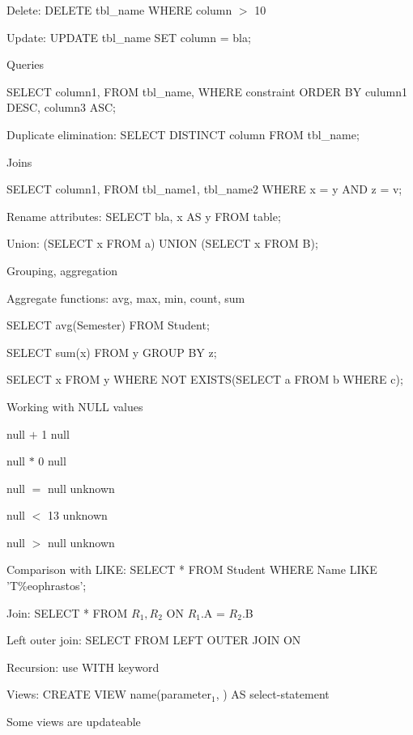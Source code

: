 		\item Delete: DELETE tbl\_name WHERE column $>$ 10
		\item Update: UPDATE tbl\_name SET column = bla;
	\enumend
	\item Queries
	\enumstart
		\item SELECT column1, \ddd FROM tbl\_name, \ddd WHERE constraint ORDER BY culumn1 DESC, column3 ASC;
		\item Duplicate elimination: SELECT DISTINCT column FROM tbl\_name;
		\item Joins
		\enumstart
			\item SELECT column1, \ddd FROM tbl\_name1, tbl\_name2 WHERE x = y AND z = v;
		\enumend
		\item Rename attributes: SELECT bla, x AS y FROM table;
		\item Union: (SELECT x FROM a) UNION (SELECT x FROM B);
		\item Grouping, aggregation
		\enumstart
			\item Aggregate functions: avg, max, min, count, sum
			\item SELECT avg(Semester) FROM Student;
			\item SELECT sum(x) FROM y GROUP BY z;
		\enumend
		\item SELECT x FROM y WHERE NOT EXISTS(SELECT a FROM b WHERE c);
	\enumend
	\item Working with NULL values
	\enumstart
		\item null $+$ 1 \arrow null
		\item null $*$ 0 \arrow null
		\item null $=$ null \arrow unknown
		\item null $<$ 13 \arrow unknown
		\item null $>$ null \arrow unknown
	\enumend
	\item Comparison with LIKE: SELECT * FROM Student WHERE Name LIKE 'T\%eophrastos';
	\item Join: SELECT * FROM $R_1, R_2$ ON $R_1$.A = $R_2$.B
	\item Left outer join: SELECT \ddd FROM \ddd LEFT OUTER JOIN \ddd ON \ddd
	\item Recursion: use WITH keyword
	\item Views: CREATE VIEW name(parameter$_1$, \ddd) AS select-statement
	\item Some views are updateable
\enumend
